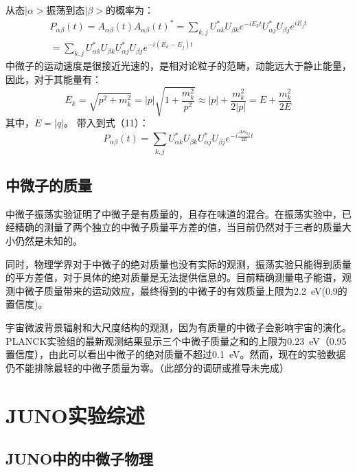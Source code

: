 \documentclass[15pt,a4paper]{article}
\begin{document}
从态$|\alpha>$振荡到态$|\beta>$的概率为：
\begin{equation}
\begin{split}
P_{\alpha\beta}(t)=A_{\alpha\beta}(t){A_{\alpha\beta}(t)}^*=\sum_{k,j}U_{\alpha k}^{*}U_{\beta k}e^{-iE_{k}t}U_{\alpha j}^{*}U_{\beta j}e^{iE_{j}t}\\
=\sum_{k,j}U_{\alpha k}^{*}U_{\beta k}U_{\alpha j}^{*}U_{\beta j}e^{-i(E_{k}-E_{j})t}
\end{split}
\end{equation}
中微子的运动速度是很接近光速的，是相对论粒子的范畴，动能远大于静止能量，因此，对于其能量有：
\begin{equation}
E_{k}=\sqrt{p^2+m_k^2}=|p|\sqrt{1+\frac{m_k^2}{p^2}}\approx |p|+\frac{m_k^2}{2|p|}=E+\frac{m_k^2}{2E}
\end{equation}
其中，$E=|q|$。
带入到式（11）：
\begin{equation}
P_{\alpha\beta}(t)=\sum_{k,j}U_{\alpha k}^{*}U_{\beta k}U_{\alpha j}^{*}U_{\beta j}e^{-i\frac{\Delta m_{kj}}{2E}t}
\end{equation}

\newpage
\subsection{中微子的质量}\label{sub:sysover}
中微子振荡实验证明了中微子是有质量的，且存在味道的混合。在振荡实验中，已经精确的测量了两个独立的中微子质量平方差的值，当目前仍然对于三者的质量大小仍然是未知的。

同时，物理学界对于中微子的绝对质量也没有实际的观测，振荡实验只能得到质量的平方差值，对于具体的绝对质量是无法提供信息的。目前精确测量电子能谱，观测中微子质量带来的运动效应，最终得到的中微子的有效质量上限为\SI{2.2}{eV}(0.9的置信度)。

宇宙微波背景辐射和大尺度结构的观测，因为有质量的中微子会影响宇宙的演化。PLANCK实验组的最新观测结果显示三个中微子质量之和的上限为\SI{0.23}{eV}（0.95置信度），由此可以看出中微子的绝对质量不超过\SI{0.1}{eV}。然而，现在的实验数据仍不能排除最轻的中微子质量为零。（此部分的调研或推导未完成）

\newpage
\section{JUNO实验综述} \label{sysdes}%

\subsection{JUNO中的中微子物理}\label{sub:sysover}
\end{document}

